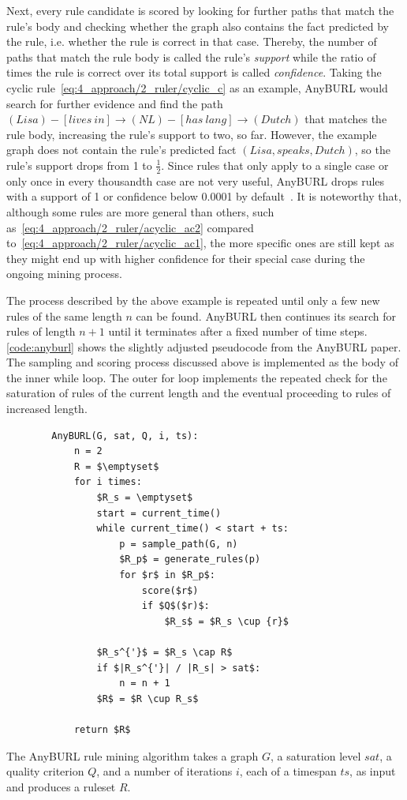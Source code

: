 Next, every rule candidate is scored by looking for further paths that match the rule's body and checking whether the graph also contains the fact predicted by the rule, i.e. whether the rule is correct in that case. Thereby, the number of paths that match the rule body is called the rule's \emph{support} while the ratio of times the rule is correct over its total support is called \emph{confidence}. Taking the cyclic rule~\ref{eq:4_approach/2_ruler/cyclic_c} as an example, AnyBURL would search for further evidence and find the path $(Lisa) - [lives~in] \rightarrow (NL) - [has~lang] \rightarrow (Dutch)$ that matches the rule body, increasing the rule's support to two, so far. However, the example graph does not contain the rule's predicted fact $(Lisa, speaks, Dutch)$, so the rule's support drops from 1 to $\frac{1}{2}$. Since rules that only apply to a single case or only once in every thousandth case are not very useful, AnyBURL drops rules with a support of 1 or confidence below 0.0001 by default~\cite{AnyBURL}. It is noteworthy that, although some rules are more general than others, such as~\ref{eq:4_approach/2_ruler/acyclic_ac2} compared to~\ref{eq:4_approach/2_ruler/acyclic_ac1}, the more specific ones are still kept as they might end up with higher confidence for their special case during the ongoing mining process.

The process described by the above example is repeated until only a few new rules of the same length $n$ can be found. AnyBURL then continues its search for rules of length $n + 1$ until it terminates after a fixed number of time steps. \autoref{code:anyburl} shows the slightly adjusted pseudocode from the AnyBURL paper. The sampling and scoring process discussed above is implemented as the body of the inner while loop. The outer for loop implements the repeated check for the saturation of rules of the current length and the eventual proceeding to rules of increased length.

\begin{listing}[t]
    \begin{lstlisting}
        AnyBURL(G, sat, Q, i, ts):
            n = 2
            R = $\emptyset$
            for i times:
                $R_s = \emptyset$
                start = current_time()
                while current_time() < start + ts:
                    p = sample_path(G, n)
                    $R_p$ = generate_rules(p)
                    for $r$ in $R_p$:
                        score($r$)
                        if $Q$($r)$:
                            $R_s$ = $R_s \cup {r}$

                $R_s^{'}$ = $R_s \cap R$
                if $|R_s^{'}| / |R_s| > sat$:
                    n = n + 1
                $R$ = $R \cup R_s$

            return $R$
    \end{lstlisting}
    \caption{The AnyBURL rule mining algorithm takes a graph $G$, a saturation level $sat$, a quality criterion $Q$, and a number of iterations $i$, each of a timespan $ts$, as input and produces a ruleset $R$.}
    \label{code:anyburl}
\end{listing}

